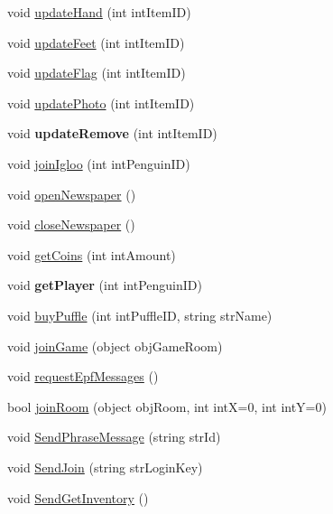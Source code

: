 \begin{DoxyCompactItemize}
void \hyperlink{classSharpenguin_1_1Tasks_a1e2a3bcb87966bebde0202356174962c}{update\-Hand} (int int\-Item\-I\-D)
\item 
void \hyperlink{classSharpenguin_1_1Tasks_afcfff4673b77a152c39934505324e794}{update\-Feet} (int int\-Item\-I\-D)
\item 
void \hyperlink{classSharpenguin_1_1Tasks_a5dbd850a020d9d459eed99a8c45d8e75}{update\-Flag} (int int\-Item\-I\-D)
\item 
void \hyperlink{classSharpenguin_1_1Tasks_a28834ede17e7850508025bbed190a641}{update\-Photo} (int int\-Item\-I\-D)
\item 
\hypertarget{classSharpenguin_1_1Tasks_af9b7a0677366bfaeba38dcc5cb0d8bb5}{void {\bfseries update\-Remove} (int int\-Item\-I\-D)}\label{classSharpenguin_1_1Tasks_af9b7a0677366bfaeba38dcc5cb0d8bb5}

\item 
void \hyperlink{classSharpenguin_1_1Tasks_a29e019a91b08cb92c9fa7f3ba9f33776}{join\-Igloo} (int int\-Penguin\-I\-D)
\item 
void \hyperlink{classSharpenguin_1_1Tasks_aca9013fed2c6e6cf5e19771aae98531d}{open\-Newspaper} ()
\item 
void \hyperlink{classSharpenguin_1_1Tasks_afa6b3fb4e044dfaf6c9520b56d276dca}{close\-Newspaper} ()
\item 
void \hyperlink{classSharpenguin_1_1Tasks_ae4e482fa82fb3c02cae015f4ae9f527c}{get\-Coins} (int int\-Amount)
\item 
\hypertarget{classSharpenguin_1_1Tasks_a5518e385cb00ea50b63cf03035d31717}{void {\bfseries get\-Player} (int int\-Penguin\-I\-D)}\label{classSharpenguin_1_1Tasks_a5518e385cb00ea50b63cf03035d31717}

\item 
void \hyperlink{classSharpenguin_1_1Tasks_a2e667922c2df819ec504636ab8523f5a}{buy\-Puffle} (int int\-Puffle\-I\-D, string str\-Name)
\item 
void \hyperlink{classSharpenguin_1_1Tasks_af7ed0b413f925907983b7242441074c1}{join\-Game} (object obj\-Game\-Room)
\item 
void \hyperlink{classSharpenguin_1_1Tasks_ab6153b32f78f2a137bda915a3a35cecd}{request\-Epf\-Messages} ()
\item 
bool \hyperlink{classSharpenguin_1_1Tasks_ad71a7aec9611f9aaf9715a52bde33c04}{join\-Room} (object obj\-Room, int int\-X=0, int int\-Y=0)
\item 
void \hyperlink{classSharpenguin_1_1Tasks_a9ceb3ef96c8a645127c4353afbcc4560}{\-Send\-Phrase\-Message} (string str\-Id)
\item 
void \hyperlink{classSharpenguin_1_1Tasks_a5965355bcfb2fd527fa4436b34a1aeb7}{\-Send\-Join} (string str\-Login\-Key)
\item 
void \hyperlink{classSharpenguin_1_1Tasks_a2fd5289a96dc2a8466554e89fed6de97}{\-Send\-Get\-Inventory} ()
\end{DoxyCompactItemize}


